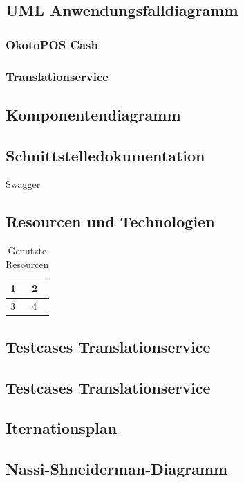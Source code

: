 \documentclass[10pt, oneside]{article}
\begin{document}
  \subsection{UML Anwendungsfalldiagramm}\label{sec:uml:aw:new}
  \subsubsection{OkotoPOS Cash}\label{sec:uml:aw:cash}
  \subsubsection{Translationservice}\label{sec:uml:aw:ts}
  \subsection{Komponentendiagramm}\label{sec:uml:komponenten}
  \subsection{Schnittstelledokumentation}
    \label{sec:swa:ts}
  Swagger
  \subsection{Resourcen und Technologien}\label{sec:resources}
    \begin{table}[ht]
      \centering
      \begin{tabular}{| l | l |}
        1 & 2 \\
        \hline
        3 & 4\\
        \hline
      \end{tabular}
      \caption{Genutzte Resourcen}
    \end{table}
  \subsection{Testcases Translationservice}\label{sec:test:ts}
  \subsection{Testcases Translationservice}\label{sec:test:tu}
  \subsection{Iternationsplan}\label{sec:iterationplan}
  \subsection{Nassi-Shneiderman-Diagramm}\label{sec:impl:algo}
\end{document}
